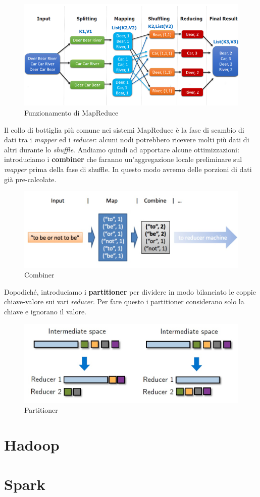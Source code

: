 \documentclass{article}
\begin{document}
\begin{appendices}
\begin{figure}[H]
    \centering
    \includegraphics[scale=0.6]{img/mapreduce.png}
    \caption{Funzionamento di MapReduce}
\end{figure}\noindent
Il collo di bottiglia più comune nei sistemi MapReduce è la fase di scambio di dati tra i \textit{mapper} ed i \textit{reducer}: alcuni nodi potrebbero ricevere molti più dati di altri durante lo \textit{shuffle}. Andiamo quindi ad apportare alcune ottimizzazioni: introduciamo i \textbf{combiner} che faranno un'aggregazione locale preliminare sul \textit{mapper} prima della fase di shuffle. In questo modo avremo delle porzioni di dati già pre-calcolate.
\begin{figure}[H]
    \centering
    \includegraphics[scale=0.4]{img/combiner.jpg}
    \caption{Combiner}
\end{figure}\noindent
Dopodiché, introduciamo i \textbf{partitioner} per dividere in modo bilanciato le coppie chiave-valore sui vari \textit{reducer}. Per fare questo i partitioner considerano solo la chiave e ignorano il valore.
\begin{figure}[H]
    \centering
    \includegraphics[scale=0.4]{img/partitioner.jpg}
    \caption{Partitioner}
\end{figure}\noindent

\newpage
\section{Hadoop}
\section{Spark}

\end{appendices}
\end{document}
